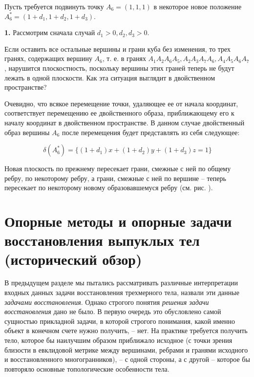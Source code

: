 \documentclass[a4paper, 12pt, titlepage]{article}
\theoremstyle{definition}
\theoremstyle{plain}
\theoremstyle{plain}
\begin{document}

Пусть требуется подвинуть точку $A_{6} = (1, 1, 1)$ в некоторое новое положение
$A_{6}^{*} = (1 + d_{1}, 1 + d_{2}, 1 + d_{3})$.

\textbf{1. } Рассмотрим сначала случай $d_{1} > 0, d_{2}, d_{3} > 0$.

Если оставить все остальные вершины и грани куба без изменения, то трех гранях,
содержащих вершину $A_{6}$, т. е. в гранях
$A_{1} A_{2} A_{6} A_{5}, A_{2} A_{3} A_{7} A_{6}, A_{4} A_{5} A_{6} A_{7}$,
нарушится плоскостность, поскольку вершины этих граней теперь не будут лежать в
одной плоскости. Как эта ситуация выглядит в двойственном пространстве?

Очевидно, что всякое перемещение точки, удаляющее ее от начала координат,
соответствует перемещению ее двойственного образа, приближающему его к началу
координат в двойственном пространстве. В данном случае двойственный образ
вершины $A_{6}$ после перемещения будет представлять из себя следующее:

\begin{equation*}
 \delta(A_{6}^{*}) = \{ (1 + d_{1}) x + (1 + d_{2}) y + (1 + d_{3}) z = 1 \}
\end{equation*}

Новая плоскость по прежнему пересекает грани, смежные с ней по общему ребру, по
некоторому ребру, а грани, смежные с ней по вершине -- теперь пересекает по
некоторому новому образовавшемуся ребру (см. рис. ).


\section{Опорные методы и опорные задачи восстановления выпуклых
тел (исторический обзор)}

В предыдущем разделе мы пытались рассматривать различные интерпретации входных
данных задачи восстановления трехмерного тела, назвали эти данные
\textit{задачами восстановления}. Однако строгого понятия \textit{решения
задачи восстановления} дано не было. В первую очередь это обусловлено самой
сущностью прикладной задачи, в которой строгого понимания, какой именно объект
в конечном счете нужно получить, -- нет. На практике требуется получить
тело, которое бы наилучшим образом приближало исходное (с точки зрения
близости в евклидовой метрике между вершинами, ребрами и гранями исходного и
восстановленного многогранников), -- с одной стороны, а с другой -- которое бы
повторяло основные топологические особенности тела.
\end{document}
